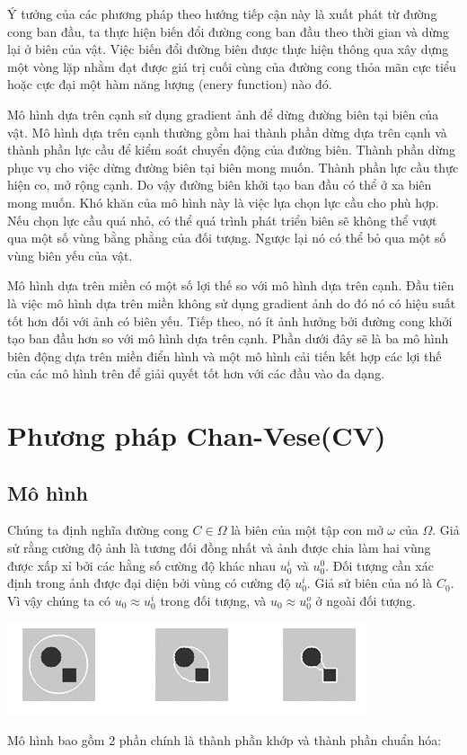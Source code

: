 \documentclass[14pt,oneside,a4paper]{extreport}
\begin{document}
Ý tưởng của các phương pháp theo hướng tiếp cận này là xuất phát từ đường cong ban đầu, ta thực hiện biến đổi đường cong ban đầu theo thời gian  và dừng lại ở biên của vật. Việc biến đổi đường biên được thực hiện thông qua xây dựng một vòng lặp nhằm đạt được giá trị cuối cùng của đường cong thỏa mãn cực tiểu hoặc cực đại một hàm năng lượng (enery function) nào đó.

Mô hình dựa trên cạnh sử dụng gradient ảnh để dừng đường biên tại biên của vật. Mô hình dựa trên cạnh thường gồm hai thành phần dừng dựa trên cạnh  và thành phần lực cầu để kiểm soát chuyển động của đường biên. Thành phần dừng phục vụ cho việc dừng đường biên tại biên mong muốn. Thành phần lực cầu thực hiện co, mở rộng cạnh. Do vậy đường biên khởi tạo ban đầu có thể ở xa biên mong muốn. Khó khăn của mô hình này là việc lựa chọn lực cầu cho phù hợp. Nếu chọn lực cầu quá nhỏ, có thể quá trình phát triển biên sẽ không thể vượt qua một số vùng bằng phằng của đối tượng. Ngược lại nó có thể bỏ qua một số vùng biên yếu của vật.

Mô hình dựa trên miền có một số lợi thế so với mô hình dựa trên cạnh. Đầu tiên là việc mô hình dựa trên miền không sử dụng gradient ảnh do đó nó có hiệu suất tốt hơn đối với ảnh có biên yếu. Tiếp theo, nó ít ảnh hưởng bởi đường cong khởi tạo ban đầu hơn so với mô hình dựa trên cạnh.  Phần dưới đây sẽ là ba mô hình biên động dựa trên miền điển hình và một mô hình cải tiến kết hợp các lợi thế của các mô hình trên để giải quyết tốt hơn với các đầu vào đa dạng.
\section{Phương pháp Chan-Vese(CV)}


\subsection{Mô hình}
Chúng ta định nghĩa đường cong $C\in \Omega$ là biên của một tập con mở $\omega$ của $\Omega$. Giả sử rằng cường độ ảnh là tương đối đồng nhất và ảnh được chia làm hai vùng được xấp xỉ bởi các hằng số cường độ khác nhau $u_0^i$ và $u_0^0$. Đối tượng cần xác định trong ảnh được đại diện bởi vùng có cường độ $u_0^i$. Giả sử biên của nó là $C_0$. Vì vậy chúng ta có $u_0\approx u_0^i$ trong đối tượng, và $u_0\approx u_0^o$ ở ngoài đối tượng.
\begin{center}
\includegraphics[scale=1]{figure/ytuong.png}
\end{center}
Mô hình bao gồm 2 phần chính là thành phần khớp và thành phần chuẩn hóa: 
\end{document}
